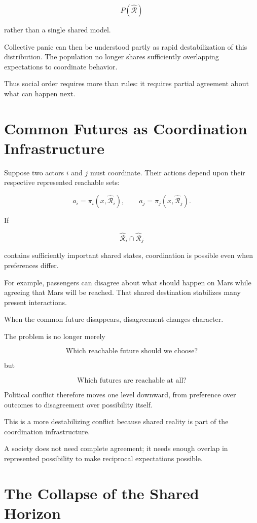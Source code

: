 \documentclass[11pt,oneside]{book}
\theoremstyle{definition}
\theoremstyle{remark}
\newcommand{\R}{\mathcal{R}}
\begin{document}
\[
P(\widehat{\R})
\]

rather than a single shared model.

Collective panic can then be understood partly as rapid destabilization of this distribution. The population no longer shares sufficiently overlapping expectations to coordinate behavior.

Thus social order requires more than rules: it requires partial agreement about what can happen next.

\section{Common Futures as Coordination Infrastructure}

Suppose two actors \(i\) and \(j\) must coordinate. Their actions depend upon their respective represented reachable sets:

\[
a_i
=
\pi_i(x,\widehat{\R}_i),
\qquad
a_j
=
\pi_j(x,\widehat{\R}_j).
\]

If

\[
\widehat{\R}_i
\cap
\widehat{\R}_j
\]

contains sufficiently important shared states, coordination is possible even when preferences differ.

For example, passengers can disagree about what should happen on Mars while agreeing that Mars will be reached. That shared destination stabilizes many present interactions.

When the common future disappears, disagreement changes character.

The problem is no longer merely

\[
\text{Which reachable future should we choose?}
\]

but

\[
\text{Which futures are reachable at all?}
\]

Political conflict therefore moves one level downward, from preference over outcomes to disagreement over possibility itself.

This is a more destabilizing conflict because shared reality is part of the coordination infrastructure.

A society does not need complete agreement; it needs enough overlap in represented possibility to make reciprocal expectations possible.

\section{The Collapse of the Shared Horizon}
\end{document}
